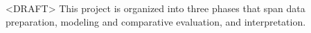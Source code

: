 



<DRAFT>
This project is organized into three phases that span data preparation, modeling and comparative evaluation, and interpretation.


